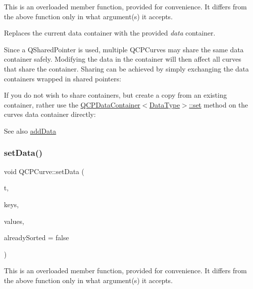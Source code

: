 This is an overloaded member function, provided for convenience. It differs from the above function only in what argument(s) it accepts.

Replaces the current data container with the provided {\itshape data} container.

Since a Q\+Shared\+Pointer is used, multiple Q\+C\+P\+Curves may share the same data container safely. Modifying the data in the container will then affect all curves that share the container. Sharing can be achieved by simply exchanging the data containers wrapped in shared pointers\+: 
\begin{DoxyCodeInclude}
\end{DoxyCodeInclude}
 If you do not wish to share containers, but create a copy from an existing container, rather use the \hyperlink{class_q_c_p_data_container_ae7042bd534fc3ce7befa2ce3f790b5bf}{Q\+C\+P\+Data\+Container$<$\+Data\+Type$>$\+::set} method on the curve\textquotesingle{}s data container directly\+: 
\begin{DoxyCodeInclude}
\end{DoxyCodeInclude}
 \begin{DoxySeeAlso}{See also}
\hyperlink{class_q_c_p_curve_a73edf394b94f3f24f07518e30565a07f}{add\+Data} 
\end{DoxySeeAlso}
\mbox{\label{class_q_c_p_curve_a0768af2c33c8dcffa3cf5bdeb53923a6}} 
\subsubsection{\texorpdfstring{set\+Data()}{setData()}\hspace{0.1cm}{\footnotesize\ttfamily [2/3]}}
{\footnotesize\ttfamily void Q\+C\+P\+Curve\+::set\+Data (\begin{DoxyParamCaption}\item[{const Q\+Vector$<$ double $>$ \&}]{t,  }\item[{const Q\+Vector$<$ double $>$ \&}]{keys,  }\item[{const Q\+Vector$<$ double $>$ \&}]{values,  }\item[{bool}]{already\+Sorted = {\ttfamily false} }\end{DoxyParamCaption})}

This is an overloaded member function, provided for convenience. It differs from the above function only in what argument(s) it accepts.

